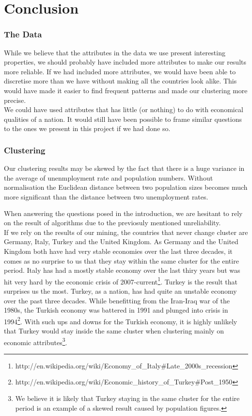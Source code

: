 \section{Conclusion}
\label{Con}
\subsubsection*{The Data}
While we believe that the attributes in the data we use present interesting properties, we should probably have included more attributes to make our results more reliable. If we had included more attributes, we would have been able to discretise more than we have without making all the countries look alike. This would have made it easier to find frequent patterns and made our clustering more precise.
\\We could have used attributes that has little (or nothing) to do with economical qualities of a nation. It would still have been possible to frame similar questions to the ones we present in this project if we had done so.
\subsubsection*{Clustering}
Our clustering results may be skewed by the fact that there is a huge variance in the average of unenmployment rate and population numbers. Without normalisation the Euclidean distance between two population sizes becomes much more significant than the distance between two unemployment rates.

When answering the questions posed in the introduction, we are hesitant to rely on the result of algorithms due to the previosuly mentioned unreliability.
\\If we rely on the results of our mining, the countries that never change cluster are Germany, Italy, Turkey and the United Kingdom. As Germany and the United Kingdom both have had very stable economies over the last three decades, it comes as no surprise to us that they stay within the same cluster for the entire period. Italy has had a mostly stable economy over the last thiry years but was hit very hard by the economic crisis of 2007-current\footnote{http://en.wikipedia.org/wiki/Economy\_of\_Italy\#Late\_2000s\_recession}. Turkey is the result that surprises us the most. Turkey, as a nation, has had quite an unstable economy over the past three decades. While benefitting from the Iran-Iraq war of the 1980s, the Turkish economy was battered in 1991 and plunged into crisis in 1994\footnote{http://en.wikipedia.org/wiki/Economic\_history\_of\_Turkey\#Post\_1950}. With such ups and downs for the Turkish economy, it is highly unlikely that Turkey would stay inside the same cluster when clustering mainly on economic attributes\footnote{We believe it is likely that Turkey staying in the same cluster for the entire period is an example of a skewed result caused by population figures.}. 

